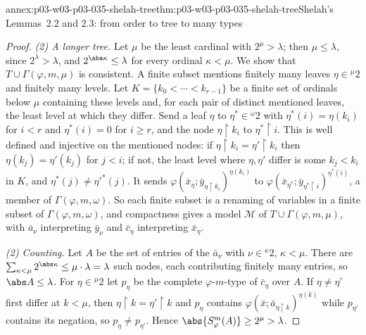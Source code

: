 \begin{annexitem}{annex:p03-w03-p03-035-shelah-tree}{thm:p03-w03-p03-035-shelah-tree}{Shelah's Lemmas~2.2 and 2.3: from order to tree to many types}
\begin{proof}
\emph{(2) A longer tree.}  Let \(\mu\) be the least cardinal with
\(2^\mu>\lambda\); then \(\mu\leq\lambda\), since \(2^\lambda>\lambda\),
and \(2^{\abs\kappa}\leq\lambda\) for every ordinal \(\kappa<\mu\).  We show that \(T\cup\Gamma(\varphi,m,\mu)\) is
consistent.  A finite subset mentions finitely many leaves
\(\eta\in{}^{\mu}2\) and finitely many levels.  Let \(K=\{k_0<\cdots<
k_{r-1}\}\) be a finite set of ordinals below \(\mu\) containing these levels
and, for each pair of distinct mentioned leaves, the least level at which
they differ.  Send a
leaf \(\eta\) to \(\eta^*\in{}^{\omega}2\) with \(\eta^*(i)=\eta(k_i)\) for
\(i<r\) and \(\eta^*(i)=0\) for \(i\geq r\), and the node
\(\eta\restriction k_i\) to \(\eta^*\restriction i\).  This is well defined
and injective on the mentioned nodes: if \(\eta\restriction k_i=
\eta'\restriction k_i\) then \(\eta(k_j)=\eta'(k_j)\) for \(j<i\); if not, the
least level where \(\eta,\eta'\) differ is some \(k_j<k_i\) in \(K\), and
\(\eta^*(j)\neq\eta'^*(j)\).  It sends \(\varphi(\bar x_\eta;\bar
y_{\eta\restriction k_i})^{\eta(k_i)}\) to
\(\varphi(\bar x_{\eta^*};\bar y_{\eta^*\restriction i})^{\eta^*(i)}\), a
member of \(\Gamma(\varphi,m,\omega)\).  So each finite subset is a renaming of
variables in a finite subset of \(\Gamma(\varphi,m,\omega)\), and
compactness gives a model \(\mathcal M\) of \(T\cup\Gamma(\varphi,m,\mu)\),
with \(\bar a_\nu\) interpreting \(\bar y_\nu\) and \(\bar c_\eta\)
interpreting \(\bar x_\eta\).

\emph{(2) Counting.}  Let \(A\) be the set of entries of the \(\bar a_\nu\)
with \(\nu\in{}^{\kappa}2\), \(\kappa<\mu\).  There are
\(\sum_{\kappa<\mu}2^{\abs\kappa}\leq\mu\cdot\lambda=\lambda\) such nodes, each
contributing finitely many entries, so \(\abs A\leq\lambda\).  For
\(\eta\in{}^{\mu}2\) let \(p_\eta\) be the complete \(\varphi\)-\(m\)-type of
\(\bar c_\eta\) over \(A\).  If \(\eta\neq\eta'\) first differ at \(k<\mu\),
then \(\eta\restriction k=\eta'\restriction k\) and \(p_\eta\) contains
\(\varphi(\bar x;\bar a_{\eta\restriction k})^{\eta(k)}\) while \(p_{\eta'}\)
contains its negation, so \(p_\eta\neq p_{\eta'}\).  Hence
\(\abs{S^m_\varphi(A)}\geq2^\mu>\lambda\).
\end{proof}
\end{annexitem}

